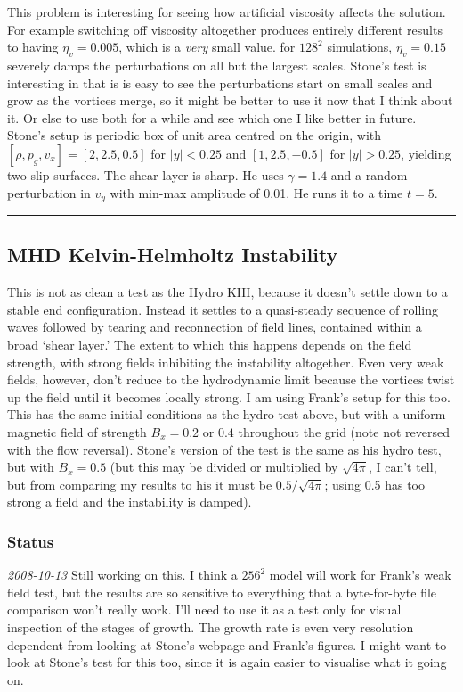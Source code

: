 \documentclass[11pt]{article}
\begin{document}
This problem is interesting for seeing how artificial viscosity
affects the solution.  For example switching off viscosity altogether
produces entirely different results to having $\eta_v=0.005$, which is
a \emph{very} small value.  for $128^2$ simulations, $\eta_v=0.15$
severely damps the perturbations on all but the largest scales.
Stone's test is interesting in that is is easy to see the
perturbations start on small scales and grow as the vortices merge, so
it might be better to use it now that I think about it.  Or else to
use both for a while and see which one I like better in future.
Stone's setup is periodic box of unit area centred on the origin, with
$[\rho,p_g,v_x]=[2,2.5,0.5]$ for $|y|<0.25$ and $[1,2.5,-0.5]$ for
$|y|>0.25$, yielding two slip surfaces.  The shear layer is sharp.  He
uses $\gamma=1.4$ and a random perturbation in $v_y$ with min-max
amplitude of 0.01.  He runs it to a time $t=5$.


\vspace{0.4cm} \hrule
\subsection{MHD Kelvin-Helmholtz Instability}
This is not as clean a test as the Hydro KHI, because it doesn't
settle down to a stable end configuration.  Instead it settles to a
quasi-steady sequence of rolling waves followed by tearing and
reconnection of field lines, contained within a broad `shear layer.'
The extent to which this happens depends on the field strength, with
strong fields inhibiting the instability altogether.  Even very weak
fields, however, don't reduce to the hydrodynamic limit because the
vortices twist up the field until it becomes locally strong.  I am
using Frank's setup for this too.  This has the same initial
conditions as the hydro test above, but with a uniform magnetic field
of strength $B_x=0.2$ or $0.4$ throughout the grid (note not reversed
with the flow reversal).  Stone's version of the test is the same as
his hydro test, but with $B_x=0.5$ (but this may be divided or
multiplied by $\sqrt{4\pi}$, I can't tell, but from comparing my
results to his it must be $0.5/\sqrt{4\pi}$; using 0.5 has too strong
a field and the instability is damped).
\subsubsection{Status}
\textit{2008-10-13} Still working on this.  I think a $256^2$ model
will work for Frank's weak field test, but the results are so
sensitive to everything that a byte-for-byte file comparison won't
really work.  I'll need to use it as a test only for visual inspection
of the stages of growth.  The growth rate is even very resolution
dependent from looking at Stone's webpage and Frank's figures.  I
might want to look at Stone's test for this too, since it is again
easier to visualise what it going on.
\end{document}
